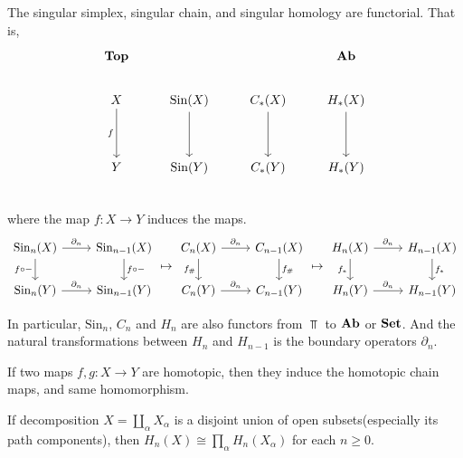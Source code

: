 \documentclass[12pt, oneside]{book}
\begin{document}
The singular simplex, singular chain, and singular homology are functorial. That is,
\begin{equation*}
    \begin{tikzcd}
        \Top & & & \Ab \\
        X \arrow[dd,"f"']&  \mathrm{Sin}(X)\arrow[dd,""] & C_{*}(X)\arrow[dd,""] & H_{*}(X)\arrow[dd,""]\\
        &  & &\\
        Y &\mathrm{Sin}(Y)& C_{*}(Y)& H_{*}(Y)\\
    \end{tikzcd}
\end{equation*}
where the map $f: X \to Y$ induces the maps.
\begin{equation*}
    \begin{tikzcd}
        \mathrm{Sin}_n(X) \arrow[r,"\partial_n"] \arrow[d,"f\circ -"'] & \mathrm{Sin}_{n-1}(X) \arrow[d,"f\circ -"]\\
        \mathrm{Sin}_n(Y) \arrow[r,"\partial_n"] & \mathrm{Sin}_{n-1}(Y)
    \end{tikzcd}
    \mapsto
    \begin{tikzcd}
        C_n(X) \arrow[r,"\partial_n"] \arrow[d,"f_{\#}"'] & C_{n-1}(X) \arrow[d,"f_{\#}"]\\
        C_n(Y) \arrow[r,"\partial_n"] & C_{n-1}(Y)
    \end{tikzcd}
    \mapsto
    \begin{tikzcd}
        H_n(X) \arrow[r,"\partial_n"] \arrow[d,"f_{*}"'] & H_{n-1}(X) \arrow[d,"f_{*}"]\\
        H_n(Y) \arrow[r,"\partial_n"] & H_{n-1}(Y)
    \end{tikzcd}
\end{equation*}


In particular, $\mathrm{Sin}_n$, $C_n$ and $H_n$ are also functors
from $\Top$ to $\mathbf{Ab}$ or $\mathbf{Set}$.
And the natural transformations between $H_n$ and $H_{n-1}$ is the boundary operators $\partial_n$.



\begin{theorem}
    If two maps $f,g : X\to Y$ are homotopic, then they induce the homotopic chain maps, and same homomorphism.
\end{theorem}










\begin{proposition}
    If decomposition $X = \coprod_{\alpha} X_\alpha$ is a disjoint union of open subsets(especially its path components), then $H_n(X) \cong \prod_{\alpha} H_n(X_\alpha)$ for each $n \geq 0$.
\end{proposition}
\end{document}

